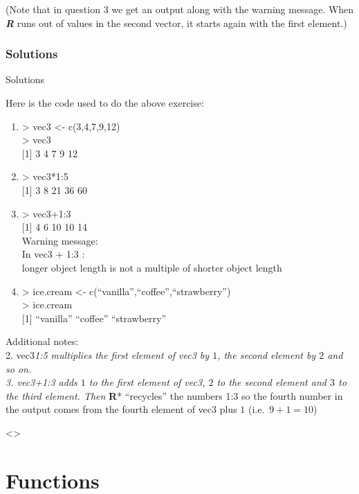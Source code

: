 \documentclass[
]{book}
\begin{document}
(Note that in question \(3\) we get an output along with the warning message. When \textbf{\emph{R}} runs out of values in the second vector, it starts again with the first element.)

\subsection{Solutions}\label{solutions-1}

Solutions

Here is the code used to do the above exercise:

\begin{enumerate}
\def\labelenumi{\arabic{enumi}.}
\item
  \textgreater{} vec3 \textless- c(3,4,7,9,12)\\
  \textgreater{} vec3\\
  {[}1{]} 3 4 7 9 12
\item
  \textgreater{} vec3*1:5\\
  {[}1{]} 3 8 21 36 60
\item
  \textgreater{} vec3+1:3\\
  {[}1{]} 4 6 10 10 14\\
  Warning message:\\
  In vec3 + 1:3 :\\
  longer object length is not a multiple of shorter object length
\item
  \textgreater{} ice.cream \textless- c(``vanilla'',``coffee'',``strawberry'')\\
  \textgreater{} ice.cream\\
  {[}1{]} ``vanilla'' ``coffee'' ``strawberry''
\end{enumerate}

Additional notes:\\
2. vec3\emph{1:5 multiplies the first element of vec3 by \(1\), the second element by \(2\) and so on.\\
3. vec3+1:3 adds \(1\) to the first element of vec3, \(2\) to the second element and \(3\) to the third element. Then }\textbf{R}* ``recycles'' the numbers 1:3 so the fourth number in the output comes from the fourth element of vec3 plus \(1\) (i.e.~\(9+1=10\))

\textless{}\details\textgreater{}

\chapter{Functions}\label{functions}
\end{document}
